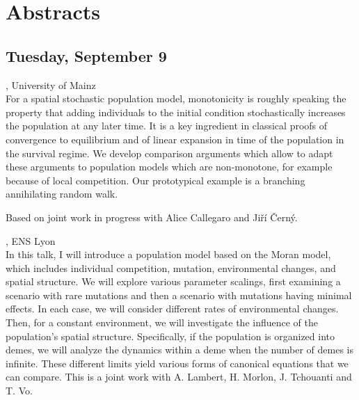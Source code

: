 \documentclass[12pt,a4paper]{article}
\begin{document}
\newpage
\section*{\sffamily Abstracts}
\subsection*{\sffamily Tuesday, September 9}
\bigskip\bigskip
{}, University of Mainz \\[2ex] For a spatial stochastic population model, monotonicity is roughly speaking the property that adding individuals to the initial condition stochastically increases the population at any later time. It is a key ingredient in classical proofs of convergence to equilibrium and of linear expansion in time of the population in the survival regime. We develop comparison arguments which allow to adapt these arguments to population models which are non-monotone, for example because of local competition. Our prototypical example is a branching annihilating random walk. 

 Based on joint work in progress with Alice Callegaro and Ji\v{r}\'{i} \v{C}ern\'y. 

\bigskip\bigskip

, ENS Lyon \\[2ex] In this talk, I will introduce a population model based on the Moran model, which includes individual competition, mutation, environmental changes, and spatial structure. We will explore various parameter scalings, first examining a scenario with rare mutations and then a scenario with mutations having minimal effects. In each case, we will consider different rates of environmental changes. Then, for a constant environment, we will investigate the influence of the population's spatial structure. Specifically, if the population is organized into demes, we will analyze the dynamics within a deme when the number of demes is infinite. These different limits yield various forms of canonical equations that we can compare. This is a joint work with A. Lambert, H. Morlon, J. Tchouanti and T. Vo. 
\end{document}
